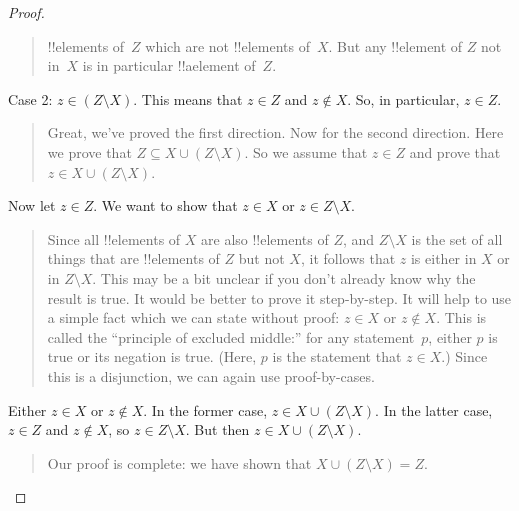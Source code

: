 \documentclass[../../../include/open-logic-section]{subfiles}
\begin{document}
\begin{proof}
\begin{quote}
    !!{element}s of~$Z$ which are not !!{element}s of~$X$.  But any
    !!{element} of $Z$ not in~$X$ is in particular !!a{element} of~$Z$.
  \end{quote}
  Case 2: $z \in (Z \setminus X)$.  This means that $z \in Z$ and $z
  \notin X$. So, in particular, $z \in Z$.
  \begin{quote}
    Great, we've proved the first direction. Now for the second
    direction. Here we prove that $Z \subseteq X \cup (Z \setminus
    X)$.  So we assume that $z \in Z$ and prove that $z \in X \cup (Z
    \setminus X)$.
  \end{quote}
  Now let $z \in Z$. We want to show that $z \in X$ or $z \in Z
  \setminus X$.
  \begin{quote}
    Since all !!{element}s of $X$ are also !!{element}s of $Z$, and $Z
    \setminus X$ is the set of all things that are !!{element}s of $Z$
    but not $X$, it follows that $z$ is either in $X$ or in $Z
    \setminus X$.  This may be a bit unclear if you don't already know
    why the result is true.  It would be better to prove it
    step-by-step.  It will help to use a simple fact which we can
    state without proof: $z \in X$ or $z \notin X$. This is called the
    ``principle of excluded middle:'' for any statement~$p$, either
    $p$ is true or its negation is true. (Here, $p$ is the statement
    that $z \in X$.)  Since this is a disjunction, we can again use
    proof-by-cases.
  \end{quote}
  Either $z \in X$ or $z \notin X$. In the former case, $z \in X \cup
  (Z \setminus X)$. In the latter case, $z \in Z$ and $z \notin X$, so
  $z \in Z \setminus X$.  But then $z \in X \cup (Z \setminus X)$.
  \begin{quote}
    Our proof is complete: we have shown that $X \cup (Z \setminus X) = Z$.
    \qedhere
  \end{quote}
\end{proof}
\end{document}
